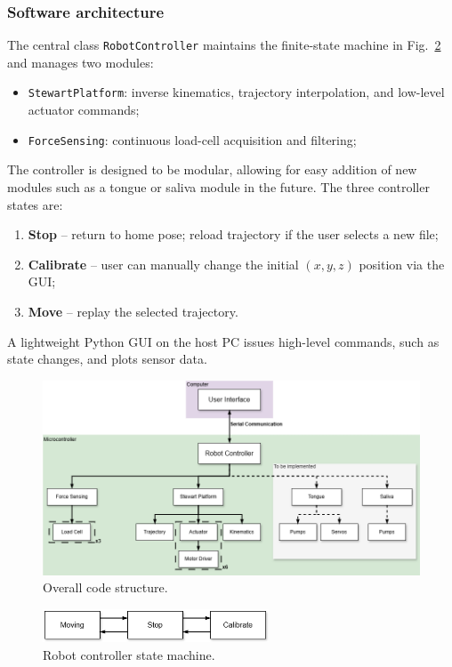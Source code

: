 \subsubsection{Software architecture}
The central class \texttt{RobotController} maintains the finite-state machine in Fig.~\ref{fig:state_machine} and manages two
 modules:  
\begin{itemize}[nosep]
    \item \texttt{StewartPlatform}: inverse kinematics, trajectory interpolation, and low-level actuator commands;
    \item \texttt{ForceSensing}: continuous load-cell acquisition and filtering;
\end{itemize}
The controller is designed to be modular, allowing for easy addition of new modules such as a tongue or saliva module in the future.
The three controller states are:
\begin{enumerate}
    \item \textbf{Stop} – return to home pose; reload trajectory if the user selects a new file;
    \item \textbf{Calibrate} – user can manually change the initial $(x,y,z)$ position via the GUI;
    \item \textbf{Move} – replay the selected trajectory.
\end{enumerate}
A lightweight Python GUI on the host PC issues high-level commands, such as state changes, and plots sensor data.  

\begin{figure}[H]
\centering
\includegraphics[width=\textwidth]{figures/code_structure.drawio.png}
\caption{Overall code structure.}
\label{fig:code_structure}
\end{figure}

\begin{figure}[H]
\centering
\includegraphics[width=0.6\textwidth]{figures/state_machine.drawio.png}
\caption{Robot controller state machine.}
\label{fig:state_machine}
\end{figure}

